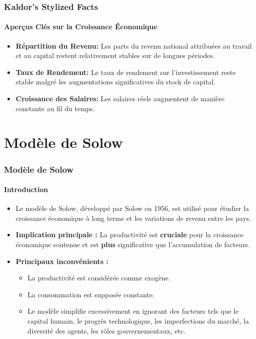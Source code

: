 \documentclass{beamer}
\begin{document}
\begin{frame}
    \frametitle{Kaldor's Stylized Facts}
    \hypertarget{kaldor}{} %
    \framesubtitle{Aperçus Clés sur la Croissance Économique}
        \begin{itemize}
            \item \textbf{Répartition du Revenu:} 
            Les parts du revenu national attribuées au travail et au capital 
            restent relativement stables sur de longues périodes.
            \hyperlink{income}{}
            \item \textbf{Taux de Rendement:} Le taux de rendement sur l'investissement reste stable malgré les augmentations significatives du stock de capital.
            \hyperlink{return}{}
            \item \textbf{Croissance des Salaires:} 
            Les salaires réels augmentent de manière constante au fil du temps.
            \hyperlink{wages}{}
        \end{itemize}
\end{frame}

\section{Modèle de Solow}

\begin{frame}
    \frametitle{Modèle de Solow}
    \framesubtitle{Introduction}
    \begin{itemize}
        \item Le modèle de Solow, développé par Solow en 1956, est utilisé pour étudier la croissance économique à long terme et les variations de revenu entre les pays.\pause
        \item \textbf{Implication principale :} 
        La productivité est \textbf{cruciale} pour la croissance économique soutenue et est 
        \textbf{plus} significative que l'accumulation de facteurs.\pause
        \item \textbf{Principaux inconvénients :}
        \begin{itemize}
            \item La productivité est considérée comme exogène.
            \item La consommation est supposée constante.
            \item Le modèle simplifie excessivement en ignorant des facteurs tels que 
            le capital humain, le progrès technologique, les imperfections du marché, 
            la diversité des agents, les rôles gouvernementaux, etc.
        \end{itemize}
    \end{itemize}
\end{frame}
\end{document}
